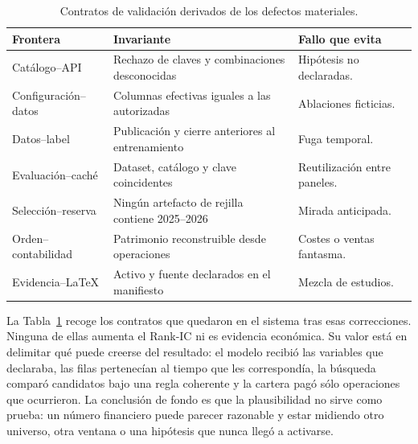 \begin{table}[htbp]
  \centering
  \small
  \begin{tabularx}{\textwidth}{p{3.0cm}X X}
    \toprule
    Frontera & Invariante & Fallo que evita \\
    \midrule
    Catálogo--API & Rechazo de claves y combinaciones desconocidas & Hipótesis no declaradas. \\
    Configuración--datos & Columnas efectivas iguales a las autorizadas & Ablaciones ficticias. \\
    Datos--label & Publicación y cierre anteriores al entrenamiento & Fuga temporal. \\
    Evaluación--caché & Dataset, catálogo y clave coincidentes & Reutilización entre paneles. \\
    Selección--reserva & Ningún artefacto de rejilla contiene 2025--2026 & Mirada anticipada. \\
    Orden--contabilidad & Patrimonio reconstruible desde operaciones & Costes o ventas fantasma. \\
    Evidencia--LaTeX & Activo y fuente declarados en el manifiesto & Mezcla de estudios. \\
    \bottomrule
  \end{tabularx}
  \caption{Contratos de validación derivados de los defectos materiales.}
  \label{tab:contratos-validacion}
\end{table}

La Tabla~\ref{tab:contratos-validacion} recoge los contratos que quedaron en el sistema tras esas
correcciones. Ninguna de ellas aumenta el Rank-IC ni es evidencia económica. Su valor está en delimitar qué
puede creerse del resultado: el modelo recibió las variables que declaraba, las filas pertenecían al
tiempo que les correspondía, la búsqueda comparó candidatos bajo una regla coherente y la cartera
pagó sólo operaciones que ocurrieron. La conclusión de fondo es que la plausibilidad no sirve como
prueba: un número financiero puede parecer razonable y estar midiendo otro universo, otra ventana o
una hipótesis que nunca llegó a activarse.
